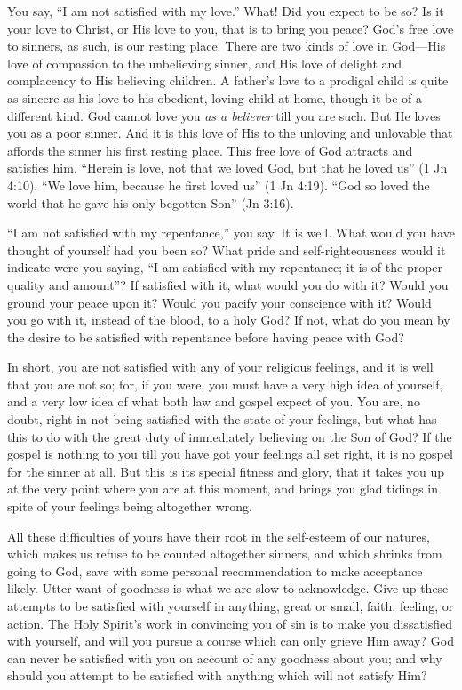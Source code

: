 \documentclass[
]{book}
\begin{document}
You say, ``I am not satisfied with my love.'' What! Did you expect to be so? Is it your love to Christ, or His love to you, that is to bring you peace? God's free love to sinners, as such, is our resting place. There are two kinds of love in God---His love of compassion to the unbelieving sinner, and His love of delight and complacency to His believing children. A father's love to a prodigal child is quite as sincere as his love to his obedient, loving child at home, though it be of a different kind. God cannot love you \emph{as a believer} till you are such. But He loves you as a poor sinner. And it is this love of His to the unloving and unlovable that affords the sinner his first resting place. This free love of God attracts and satisfies him. ``Herein is love, not that we loved God, but that he loved us'' (1 Jn 4:10). ``We love him, because he first loved us'' (1 Jn 4:19). ``God so loved the world that he gave his only begotten Son'' (Jn 3:16).

``I am not satisfied with my repentance,'' you say. It is well. What would you have thought of yourself had you been so? What pride and self-righteousness would it indicate were you saying, ``I am satisfied with my repentance; it is of the proper quality and amount''? If satisfied with it, what would you do with it? Would you ground your peace upon it? Would you pacify your conscience with it? Would you go with it, instead of the blood, to a holy God? If not, what do you mean by the desire to be satisfied with repentance before having peace with God?

In short, you are not satisfied with any of your religious feelings, and it is well that you are not so; for, if you were, you must have a very high idea of yourself, and a very low idea of what both law and gospel expect of you. You are, no doubt, right in not being satisfied with the state of your feelings, but what has this to do with the great duty of immediately believing on the Son of God? If the gospel is nothing to you till you have got your feelings all set right, it is no gospel for the sinner at all. But this is its special fitness and glory, that it takes you up at the very point where you are at this moment, and brings you glad tidings in spite of your feelings being altogether wrong.

All these difficulties of yours have their root in the self-esteem of our natures, which makes us refuse to be counted altogether sinners, and which shrinks from going to God, save with some personal recommendation to make acceptance likely. Utter want of goodness is what we are slow to acknowledge. Give up these attempts to be satisfied with yourself in anything, great or small, faith, feeling, or action. The Holy Spirit's work in convincing you of sin is to make you dissatisfied with yourself, and will you pursue a course which can only grieve Him away? God can never be satisfied with you on account of any goodness about you; and why should you attempt to be satisfied with anything which will not satisfy Him?
\end{document}
